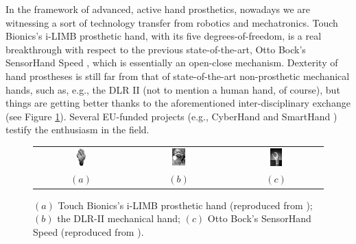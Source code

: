 In the framework of advanced, active hand prosthetics, nowadays we are
witnessing a sort of technology transfer from robotics and
mechatronics. Touch Bionics's i-LIMB \cite{ilimb} prosthetic hand,
with its five degrees-of-freedom, is a real breakthrough with respect
to the previous state-of-the-art, Otto Bock's SensorHand Speed
\cite{sensorhand}, which is essentially an open-close
mechanism. Dexterity of hand prostheses is still far from that of
state-of-the-art non-prosthetic mechanical hands, such as, e.g., the
DLR II \cite{Hua2006} (not to mention a human hand, of course), but
things are getting better thanks to the aforementioned
inter-disciplinary exchange (see Figure \ref{fig:hands}). Several
EU-funded projects (e.g., CyberHand \cite{CyberHand} and SmartHand
\cite{smarthand}) testify the enthusiasm in the field.

\begin{figure}
  \begin{tabular}{ccc}
    \includegraphics[width=0.14\textwidth]{figs/hands_TB.jpg} &
    \includegraphics[width=0.14\textwidth]{figs/hands_DLRII.jpg} &
    \includegraphics[width=0.14\textwidth]{figs/hands_OB.jpg} \\
    $(a)$ & $(b)$ & $(c)$
  \end{tabular}
  \caption{$(a)$ Touch Bionics's i-LIMB prosthetic hand (reproduced
    from \cite{ilimb}); $(b)$ the DLR-II mechanical hand; $(c)$ Otto
    Bock's SensorHand Speed (reproduced from \cite{sensorhand}).}
  \label{fig:hands}
\end{figure}

